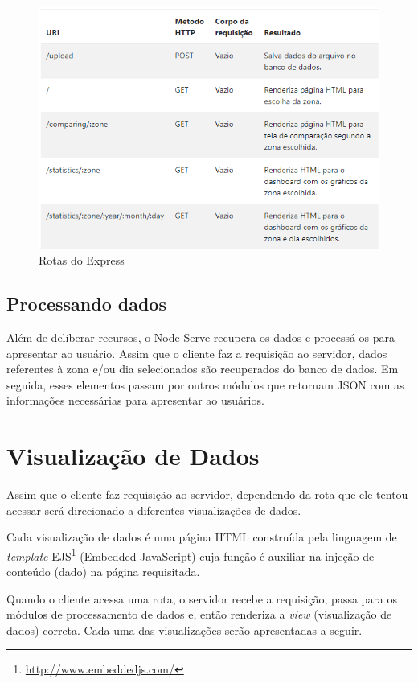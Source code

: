 \begin{figure}[!h]
  \caption{\label{rotas}Rotas do Express}
  \begin{center}
    \includegraphics[width=1.0\textwidth]{img/rotas.png}
  \end{center}
\end{figure}

\subsection{Processando dados}
Além de deliberar recursos, o Node Serve recupera os dados e processá-os para
apresentar ao usuário. Assim que o cliente faz a requisição ao servidor, dados
referentes à zona e/ou dia selecionados são recuperados do banco de dados. Em
seguida, esses elementos passam por outros módulos que retornam JSON com as
informações necessárias para apresentar ao usuários.

\section{Visualização de Dados}
\label{data-view}
Assim que o cliente faz requisição ao servidor, dependendo da rota que ele tentou acessar será direcionado
a diferentes visualizações de dados.

Cada visualização de dados é uma página HTML construída pela
linguagem de \emph{template} EJS\footnote{\url{http://www.embeddedjs.com/}} (Embedded JavaScript) cuja função é
auxiliar na injeção de conteúdo (dado) na página requisitada.

Quando o cliente acessa uma rota, o servidor recebe a requisição, passa para os
módulos de processamento de dados e, então renderiza a \emph{view} (visualização de dados) correta. Cada
uma das visualizações serão apresentadas a seguir.

